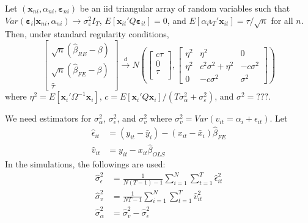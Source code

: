 \begin{thm}
  Let $\left( \mathbf{x}_{ni}, \alpha_{ni}, \boldsymbol{\varepsilon}_{ni} \right)$ be an iid triangular array of random variables such that $Var(\boldsymbol{\varepsilon}_i|\mathbf{x}_{ni},\alpha_{ni})\rightarrow \sigma_{\varepsilon}^2 I_T$, $E[\mathbf{x}_{it}'Q\boldsymbol{\varepsilon}_{it}]=0$, and $E\left[ \alpha_i \boldsymbol{\iota}_T'\mathbf{x}_{it} \right]=\tau/\sqrt{n}$ for all $n$.
  Then, under standard regularity conditions,
\[
  \left[\begin{array}{c}
\sqrt{n} (\widehat{\beta}_{RE} - \beta)\\
\sqrt{n} (\widehat{\beta}_{FE} - \beta)\\
\widehat{\tau}
\end{array}\right] \overset{d}{\rightarrow} N \left( 
\left[\begin{array}{c}
c\tau \\
0  \\
\tau\\
\end{array}\right],  
\left[\begin{array}{ccc}
\eta^2 & \eta^2 & 0 \\
\eta^2 & c^2\sigma^2 + \eta^2 & -c\sigma^2\\ 
0 & -c\sigma^2 & \sigma^2
\end{array}\right] \right)
\]
where $\eta^2 = E[\mathbf{x}_i'\Omega^{-1}\mathbf{x}_i]$, $c = E[\mathbf{x}_i' Q \mathbf{x}_i]/(T\sigma_\alpha^2 + \sigma_\varepsilon^2)$, and $\sigma^2 = ???$.
\end{thm}


We need estimators for $\sigma_\alpha^2$, $\sigma_\epsilon^2$, and $\sigma_v^2$ where $\sigma_v^2 = Var(v_{it} = \alpha_i + \epsilon_{it})$. Let 
\begin{align*}
\widehat{\epsilon}_{it}& = (y_{it} -\bar{y}_i) - (x_{it} - \bar{x}_i) \widehat{\beta}_{FE}\\
\widehat{v}_{it} &= y_{it} - x_{it} \widehat{\beta}_{OLS}
\end{align*} 
In the simulations, the followings are used: 
\begin{align*}
\widehat{\sigma}_\epsilon^2 &= \frac{1}{N(T-1)-1} \sum_{i=1}^N \sum_{t=1}^T \widehat{\epsilon}_{it}^2\\
\widehat{\sigma}_v^2 &= \frac{1}{NT-1} \sum_{i=1}^N \sum_{t=1}^T \widehat{v}_{it}^2\\
\widehat{\sigma}_\alpha^2 &= \widehat{\sigma}_v^2 - \widehat{\sigma}_\epsilon^2
\end{align*}

